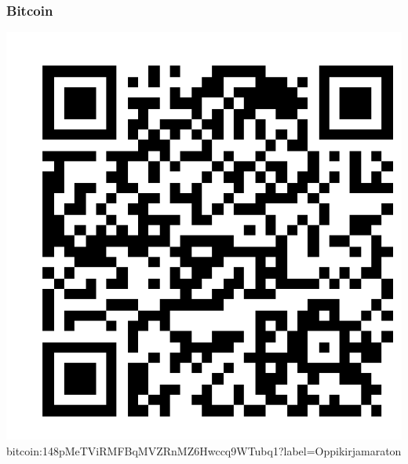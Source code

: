\subsubsection*{Bitcoin}

\includegraphics[scale=0.5]{content/pictures/Oppikirjamaraton-Bitcoin.png} \\
bitcoin:148pMeTViRMFBqMVZRnMZ6Hwccq9WTubq1?label=Oppikirjamaraton
